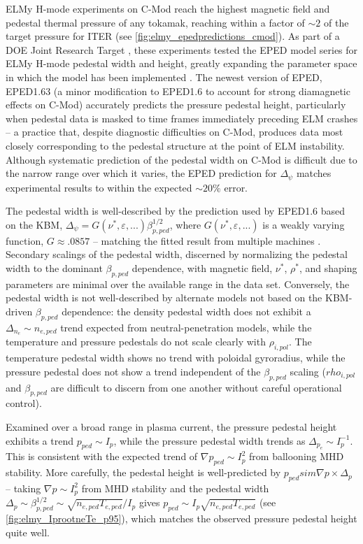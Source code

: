 ELMy H-mode experiments on C-Mod reach the highest magnetic field and pedestal thermal pressure of any tokamak, reaching within a factor of $\sim 2$ of the target pressure for ITER (see \cref{fig:elmy_epedpredictions_cmod}).  As part of a DOE Joint Research Target \cite{Groebner2013}, these experiments tested the EPED model series \cite{Snyder2009} for ELMy H-mode pedestal width and height, greatly expanding the parameter space in which the model has been implemented \cite{Walk2012}.  The newest version of EPED, EPED1.63 (a minor modification to EPED1.6 to account for strong diamagnetic effects on C-Mod) accurately predicts the pressure pedestal height, particularly when pedestal data is masked to time frames immediately preceding ELM crashes -- a practice that, despite diagnostic difficulties on C-Mod, produces data most closely corresponding to the pedestal structure at the point of ELM instability.  Although systematic prediction of the pedestal width on C-Mod is difficult due to the narrow range over which it varies, the EPED prediction for $\Delta_\psi$ matches experimental results to within the expected $\sim 20\%$ error.  

The pedestal width is well-described by the prediction used by EPED1.6 based on the KBM, $\Delta_\psi = G(\nu^*,\varepsilon,...) \beta_{p,ped}^{1/2}$, where $G(\nu^*,\varepsilon,...)$ is a weakly varying function, $G \approx .0857$ -- matching the fitted result from multiple machines \cite{Groebner2013}.  Secondary scalings of the pedestal width, discerned by normalizing the pedestal width to the dominant $\beta_{p,ped}$ dependence, with magnetic field, $\nu^*$, $\rho^*$, and shaping parameters are minimal over the available range in the data set.  Conversely, the pedestal width is not well-described by alternate models not based on the KBM-driven $\beta_{p,ped}$ dependence: the density pedestal width does not exhibit a $\Delta_{n_e} \sim n_{e,ped}$ trend expected from neutral-penetration models, while the temperature and pressure pedestals do not scale clearly with $\rho_{i,pol}$.  The temperature pedestal width shows no trend with poloidal gyroradius, while the pressure pedestal does not show a trend independent of the $\beta_{p,ped}$ scaling ($rho_{i,pol}$ and $\beta_{p,ped}$ are difficult to discern from one another without careful operational control).

Examined over a broad range in plasma current, the pressure pedestal height exhibits a trend $p_{ped} \sim I_p$, while the pressure pedestal width trends as $\Delta_{p_e} \sim I_p^{-1}$.  This is consistent with the expected trend of $\nabla p_{ped} \sim I_p^2$ from ballooning MHD stability.  More carefully, the pedestal height is well-predicted by $p_{ped} sim \nabla p \times \Delta_{p}$ -- taking $\nabla p \sim I_p^2$ from MHD stability and the pedestal width $\Delta_{p} \sim \beta_{p,ped}^{1/2} \sim \sqrt{n_{e,ped} T_{e,ped}}/I_p$ gives $p_{ped} \sim I_p \sqrt{n_{e,ped} T_{e,ped}}$ (see \cref{fig:elmy_IprootneTe_p95}), which matches the observed pressure pedestal height quite well.  

